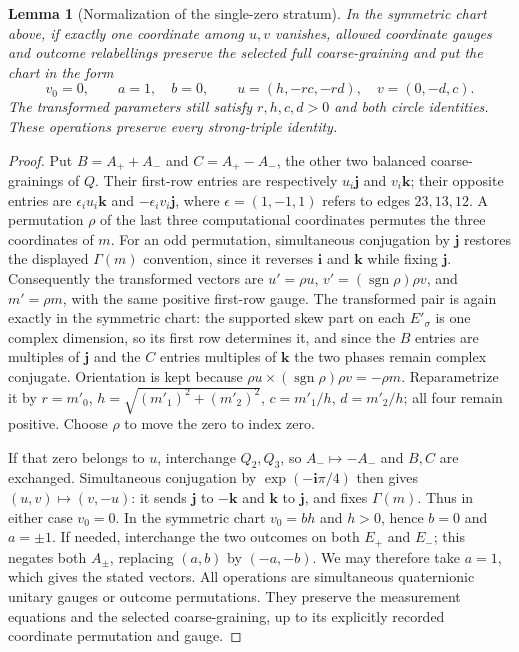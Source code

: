 \documentclass[11pt]{article}
\newtheorem{lemma}[theorem]{Lemma}
\begin{document}
\begin{lemma}[Normalization of the single-zero stratum]
\label{lem:stratumsymmetry}
In the symmetric chart above, if exactly one coordinate among $u,v$
vanishes, allowed coordinate gauges and outcome relabellings preserve
the selected full coarse-graining and put the chart in the form
\[
 v_0=0,\qquad a=1,\quad b=0,\qquad
 u=(h,-rc,-rd),\quad v=(0,-d,c).
\]
The transformed parameters still satisfy $r,h,c,d>0$ and both circle
identities. These operations preserve every strong-triple identity.
\end{lemma}
\begin{proof}
Put $B=A_++A_-$ and $C=A_+-A_-$, the other two balanced
coarse-grainings of $Q$. Their first-row entries are respectively
$u_i\mathbf j$ and $v_i\mathbf k$; their opposite entries are
$\epsilon_i u_i\mathbf k$ and $-\epsilon_i v_i\mathbf j$,
where $\epsilon=(1,-1,1)$ refers to edges $23,13,12$.
A permutation $\rho$ of the last three computational coordinates
permutes the three coordinates of $m$. For an odd permutation,
simultaneous conjugation by $\mathbf j$ restores the displayed
$\Gamma(m)$ convention, since it reverses $\mathbf i$ and
$\mathbf k$ while fixing $\mathbf j$.
Consequently the transformed vectors are
$u'=\rho u$, $v'=(\operatorname{sgn}\rho)\rho v$, and
$m'=\rho m$, with the same positive first-row gauge.
The transformed pair is again exactly in the symmetric chart: the
supported skew part on each $E'_\sigma$ is one complex dimension, so
its first row determines it, and since the $B$ entries are multiples of
$\mathbf j$ and the $C$ entries multiples of $\mathbf k$ the two phases
remain complex conjugate. Orientation is kept because
$\rho u\times(\operatorname{sgn}\rho)\rho v=-\rho m$.
Reparametrize it by $r=m'_0$, $h=\sqrt{(m'_1)^2+(m'_2)^2}$,
$c=m'_1/h$, $d=m'_2/h$; all four remain positive.
Choose $\rho$ to move the zero to index zero.

If that zero belongs to $u$, interchange $Q_2,Q_3$, so
$A_-\mapsto-A_-$ and $B,C$ are exchanged. Simultaneous conjugation
by $\exp(-\mathbf i\pi/4)$ then gives
$(u,v)\mapsto(v,-u)$: it sends $\mathbf j$ to $-\mathbf k$
and $\mathbf k$ to $\mathbf j$, and fixes $\Gamma(m)$.
Thus in either case $v_0=0$. In the symmetric chart $v_0=bh$ and
$h>0$, hence $b=0$ and $a=\pm1$.
If needed, interchange the two outcomes on both $E_+$ and $E_-$;
this negates both $A_\pm$, replacing $(a,b)$ by $(-a,-b)$.
We may therefore take $a=1$, which gives the stated vectors.
All operations are simultaneous quaternionic unitary gauges or
outcome permutations. They preserve the measurement equations and
the selected coarse-graining, up to its explicitly recorded coordinate
permutation and gauge.
\end{proof}
\end{document}
